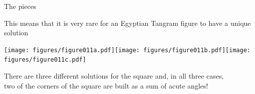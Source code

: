 \documentclass[14pt]{beamer}
\begin{document}

    \begin{frame}{The pieces}
        \begin{center}
            This means that it is very rare for an Egyptian Tangram figure to have a unique solution

            \bigskip \bigskip

            \texttt{[image: figures/figure011a.pdf]}\quad\texttt{[image: figures/figure011b.pdf]}\quad\texttt{[image: figures/figure011c.pdf]} \\

            \vspace{2em}

            {\footnotesize There are three different solutions for the square and, in all three cases,\\two of the corners of the square are built as a sum of acute angles!}
        \end{center}
    \end{frame}

\end{document}
